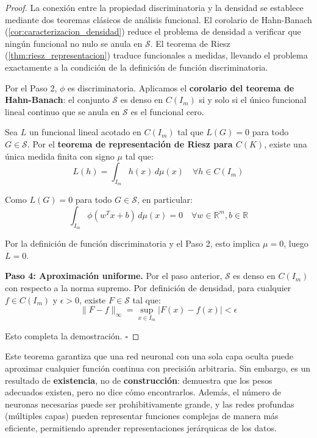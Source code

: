\begin{proof}
	La conexión entre la propiedad discriminatoria y la densidad se establece mediante dos teoremas clásicos de análisis funcional. El corolario de Hahn-Banach (\autoref{cor:caracterizacion_densidad}) reduce el problema de densidad a verificar que ningún funcional no nulo se anula en \(\mathcal{S}\). El teorema de Riesz (\autoref{thm:riesz_representacion}) traduce funcionales a medidas, llevando el problema exactamente a la condición de la definición de función discriminatoria.

	Por el Paso 2, \(\phi\) es discriminatoria. Aplicamos el \textbf{corolario del teorema de Hahn-Banach}: el conjunto \(\mathcal{S}\) es denso en \(C(I_m)\) si y solo si el único funcional lineal continuo que se anula en \(\mathcal{S}\) es el funcional cero.

	Sea \(L\) un funcional lineal acotado en \(C(I_m)\) tal que \(L(G) = 0\) para todo \(G \in \mathcal{S}\). Por el \textbf{teorema de representación de Riesz para \(C(K)\)}, existe una única medida finita con signo \(\mu\) tal que:
	\[
		L(h) = \int_{I_m} h(x) \, d\mu(x) \quad \forall h \in C(I_m)
	\]

	Como \(L(G) = 0\) para todo \(G \in \mathcal{S}\), en particular:
	\[
		\int_{I_m} \phi(w^T x + b) \, d\mu(x) = 0 \quad \forall w \in \mathbb{R}^m, b \in \mathbb{R}
	\]

	Por la definición de función discriminatoria y el Paso 2, esto implica \(\mu = 0\), luego \(L = 0\).

	\textbf{Paso 4: Aproximación uniforme.}
	Por el paso anterior, \(\mathcal{S}\) es denso en \(C(I_m)\) con respecto a la norma supremo. Por definición de densidad, para cualquier \(f \in C(I_m)\) y \(\epsilon > 0\), existe \(F \in \mathcal{S}\) tal que:
	\[
		\|F - f\|_\infty = \sup_{x \in I_m} |F(x) - f(x)| < \epsilon
	\]

	Esto completa la demostración. \(\square\)
\end{proof}

Este teorema garantiza que una red neuronal con una sola capa oculta puede aproximar cualquier función continua con precisión arbitraria. Sin embargo, es un resultado de \textbf{existencia}, no de \textbf{construcción}: demuestra que los pesos adecuados existen, pero no dice cómo encontrarlos. Además, el número de neuronas necesarias puede ser prohibitivamente grande, y las redes profundas (múltiples capas) pueden representar funciones complejas de manera más eficiente, permitiendo aprender representaciones jerárquicas de los datos.

